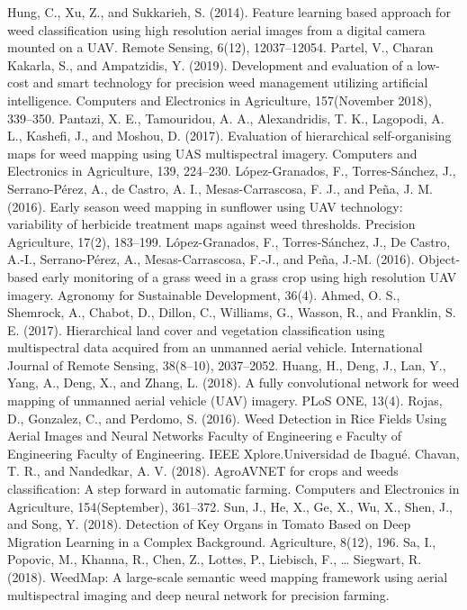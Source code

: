 \documentclass[journal,article,submit,moreauthors,pdftex]{Definitions/mdpi}
\begin{document}
\begin{thebibliography}{999}
 Hung, C., Xu, Z., and Sukkarieh, S. (2014). Feature learning based approach for weed classification using high resolution aerial images from a digital camera mounted on a UAV. Remote Sensing, 6(12), 12037–12054.
 Partel, V., Charan Kakarla, S., and Ampatzidis, Y. (2019). Development and evaluation of a low-cost and smart technology for precision weed management utilizing artificial intelligence. Computers and Electronics in Agriculture, 157(November 2018), 339–350.
 Pantazi, X. E., Tamouridou, A. A., Alexandridis, T. K., Lagopodi, A. L., Kashefi, J., and Moshou, D. (2017). Evaluation of hierarchical self-organising maps for weed mapping using UAS multispectral imagery. Computers and Electronics in Agriculture, 139, 224–230.
 López-Granados, F., Torres-Sánchez, J., Serrano-Pérez, A., de Castro, A. I., Mesas-Carrascosa, F. J., and Peña, J. M. (2016). Early season weed mapping in sunflower using UAV technology: variability of herbicide treatment maps against weed thresholds. Precision Agriculture, 17(2), 183–199.
 López-Granados, F., Torres-Sánchez, J., De Castro, A.-I., Serrano-Pérez, A., Mesas-Carrascosa, F.-J., and Peña, J.-M. (2016). Object-based early monitoring of a grass weed in a grass crop using high resolution UAV imagery. Agronomy for Sustainable Development, 36(4).
 Ahmed, O. S., Shemrock, A., Chabot, D., Dillon, C., Williams, G., Wasson, R., and Franklin, S. E. (2017). Hierarchical land cover and vegetation classification using multispectral data acquired from an unmanned aerial vehicle. International Journal of Remote Sensing, 38(8–10), 2037–2052.
 Huang, H., Deng, J., Lan, Y., Yang, A., Deng, X., and Zhang, L. (2018). A fully convolutional network for weed mapping of unmanned aerial vehicle (UAV) imagery. PLoS ONE, 13(4).
 Rojas, D., Gonzalez, C., and Perdomo, S. (2016). Weed Detection in Rice Fields Using Aerial Images and Neural Networks Faculty of Engineering e Faculty of Engineering Faculty of Engineering. IEEE Xplore.Universidad de Ibagué. 
 Chavan, T. R., and Nandedkar, A. V. (2018). AgroAVNET for crops and weeds classification: A step forward in automatic farming. Computers and Electronics in Agriculture, 154(September), 361–372.
 Sun, J., He, X., Ge, X., Wu, X., Shen, J., and Song, Y. (2018). Detection of Key Organs in Tomato Based on Deep Migration Learning in a Complex Background. Agriculture, 8(12), 196.
 Sa, I., Popovic, M., Khanna, R., Chen, Z., Lottes, P., Liebisch, F., … Siegwart, R. (2018). WeedMap: A large-scale semantic weed mapping framework using aerial multispectral imaging and deep neural network for precision farming.

\end{thebibliography}
\end{document}

